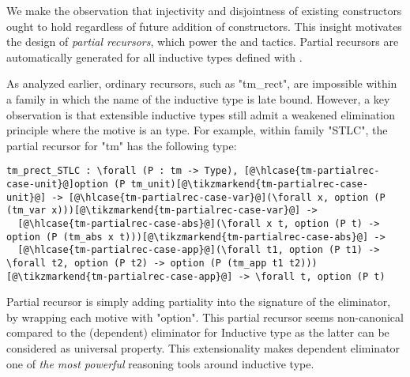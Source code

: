 
We make the observation
that injectivity and disjointness of existing constructors ought to hold
regardless of future addition of constructors.
%
This insight motivates the design of \emph{partial recursors}, which
power the  and  tactics.
Partial recursors are automatically generated for all inductive types
defined with .

As analyzed earlier, ordinary recursors, such as "tm_rect", are impossible
within a family in which the name of the inductive type is late bound.
However,
a key observation is that extensible inductive types still admit a
weakened elimination principle where the motive is an  type.
For example, within family "STLC", the partial recursor for
"tm" has the following type:

\begin{centered}
\begin{minipage}{\textwidth}
\newcommand\hlcase[1]{\tikzmarkin[disable rounded corners=true,set fill color=yellow!18,set border color=yellow!18]{#1}(0.00,-0.05)(-0.00,0.20)}
\begin{lstlisting}[basicstyle=\fontsize{8.25}{9.9}\ttfamily]
tm_prect_STLC : \forall (P : tm -> Type), [@\hlcase{tm-partialrec-case-unit}@]option (P tm_unit)[@\tikzmarkend{tm-partialrec-case-unit}@] -> [@\hlcase{tm-partialrec-case-var}@](\forall x, option (P (tm_var x)))[@\tikzmarkend{tm-partialrec-case-var}@] ->
  [@\hlcase{tm-partialrec-case-abs}@](\forall x t, option (P t) -> option (P (tm_abs x t)))[@\tikzmarkend{tm-partialrec-case-abs}@] ->
  [@\hlcase{tm-partialrec-case-app}@](\forall t1, option (P t1) -> \forall t2, option (P t2) -> option (P (tm_app t1 t2)))[@\tikzmarkend{tm-partialrec-case-app}@] -> \forall t, option (P t)
\end{lstlisting}
\end{minipage}
\end{centered}



Partial recursor is simply adding partiality into the signature of the eliminator, by wrapping each motive with "option". This partial recursor seems non-canonical compared to the (dependent) eliminator for Inductive type as the latter can be considered as universal property. This extensionality makes dependent eliminator one of \textit{the most powerful} reasoning tools around inductive type. 


